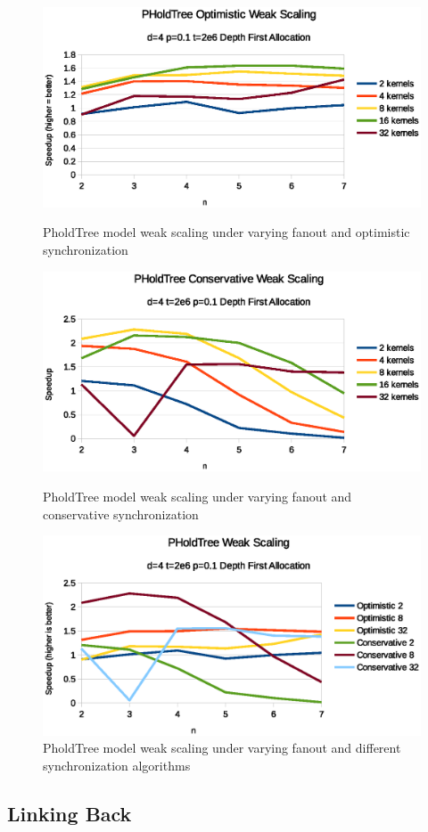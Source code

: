 \begin{figure}
    \center

    \includegraphics[width=\modelfraction\columnwidth]{fig/pholdtreeweakscalingnopt.eps}
    \caption{PholdTree model weak scaling under varying fanout and optimistic synchronization}
    \label{fig:PholdTree_plot_weaknopt}

    \includegraphics[width=\modelfraction\columnwidth]{fig/pholdtreeweakscalingncon.eps}
    \caption{PholdTree model weak scaling under varying fanout and conservative synchronization}
    \label{fig:PholdTree_plot_weakncon}

    \includegraphics[width=\modelfraction\columnwidth]{fig/pholdtreeweakscalingall.eps}
    \caption{PholdTree model weak scaling under varying fanout and different synchronization algorithms}
    \label{fig:PholdTree_plot_weakall}
\end{figure}

\subsection{Linking Back}
